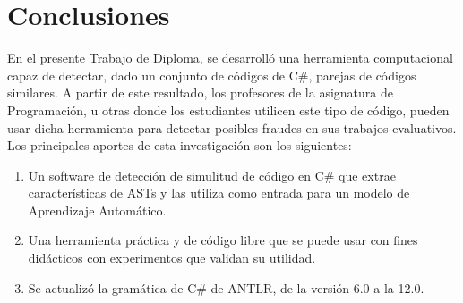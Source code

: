 \chapter{Conclusiones}

 En el presente Trabajo de Diploma, se desarrolló una herramienta computacional capaz de detectar, dado un conjunto de códigos de C\#, parejas de códigos similares. A partir de este resultado, los profesores de la asignatura de Programación, u otras donde los estudiantes utilicen este tipo de código, pueden usar dicha herramienta para detectar posibles fraudes en sus trabajos evaluativos. Los principales aportes de esta investigación son los siguientes:
 \begin{enumerate}
 \item Un software de detección de simulitud de código en C\# que extrae características de ASTs y las utiliza como entrada para un modelo de Aprendizaje Automático.
 
 \item Una herramienta práctica y de código libre que se puede usar con fines didácticos con experimentos que validan su utilidad.
 
 \item Se actualizó la gramática de C\# de ANTLR, de la versión 6.0 a la 12.0.
 \end{enumerate}

